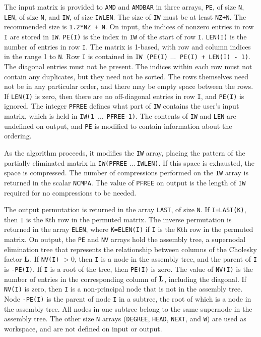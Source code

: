 \documentclass[11pt]{article}
\newcommand{\m}[1]{{\bf{#1}}}       %
\begin{document}
The input matrix is provided to {\tt AMD} and {\tt AMDBAR}
in three arrays, {\tt PE}, of size {\tt N},
{\tt LEN}, of size {\tt N}, and {\tt IW}, of size {\tt IWLEN}.  The size of
{\tt IW} must be at least {\tt NZ+N}.  The recommended size is
{\tt 1.2*NZ + N}.
On input, the indices of nonzero entries in row {\tt I} are stored in {\tt IW}.
{\tt PE(I)} is the index in {\tt IW} of the start of row {\tt I}.
{\tt LEN(I)} is the number of entries in row {\tt I}.
The matrix is 1-based, with row and column indices in the range 1 to {\tt N}.
Row {\tt I} is contained in
{\tt IW (PE(I)} $\ldots \:$ {\tt PE(I) + LEN(I) - 1)}.
The diagonal entries must not be present.  The indices within each row must
not contain any duplicates, but they need not be sorted.  The rows
themselves need not be in any particular order, and there may be empty space
between the rows.  If {\tt LEN(I)} is zero, then there are no off-diagonal
entries in row {\tt I}, and {\tt PE(I)} is ignored.  The integer
{\tt PFREE} defines what part of {\tt IW} contains the user's input matrix,
which is held in {\tt IW(1}~$\ldots~\:${\tt PFREE-1)}.
The contents of {\tt IW} and {\tt LEN} are undefined on output,
and {\tt PE} is modified to contain information about the ordering.

As the algorithm proceeds, it modifies the {\tt IW} array, placing the
pattern of the partially eliminated matrix in
{\tt IW(PFREE} $\ldots \:${\tt IWLEN)}.
If this space is exhausted, the space is compressed.
The number of compressions performed on the {\tt IW} array is
returned in the scalar {\tt NCMPA}.  The value of {\tt PFREE} on output is the
length of {\tt IW} required for no compressions to be needed.

The output permutation is returned in the array {\tt LAST}, of size {\tt N}.
If {\tt I=LAST(K)}, then {\tt I} is the {\tt K}th row in the permuted
matrix.  The inverse permutation is returned in the array {\tt ELEN}, where
{\tt K=ELEN(I)} if {\tt I} is the {\tt K}th row in the permuted matrix.
On output, the {\tt PE} and {\tt NV} arrays hold the assembly tree,
a supernodal elimination tree that represents the relationship between
columns of the Cholesky factor $\m{L}$.
If {\tt NV(I)} $> 0$, then {\tt I} is a node in the assembly
tree, and the parent of {\tt I} is {\tt -PE(I)}.  If {\tt I} is a root of
the tree, then {\tt PE(I)} is zero.  The value of {\tt NV(I)} is the
number of entries in the corresponding column of $\m{L}$, including the
diagonal.
If {\tt NV(I)} is zero, then {\tt I} is a non-principal node that is
not in the assembly tree.  Node {\tt -PE(I)} is the parent of node {\tt I}
in a subtree, the root of which is a node in the assembly tree.  All nodes
in one subtree belong to the same supernode in the assembly tree.
The other size {\tt N} arrays
({\tt DEGREE}, {\tt HEAD}, {\tt NEXT}, and {\tt W}) are used as workspace,
and are not defined on input or output.
\end{document}
